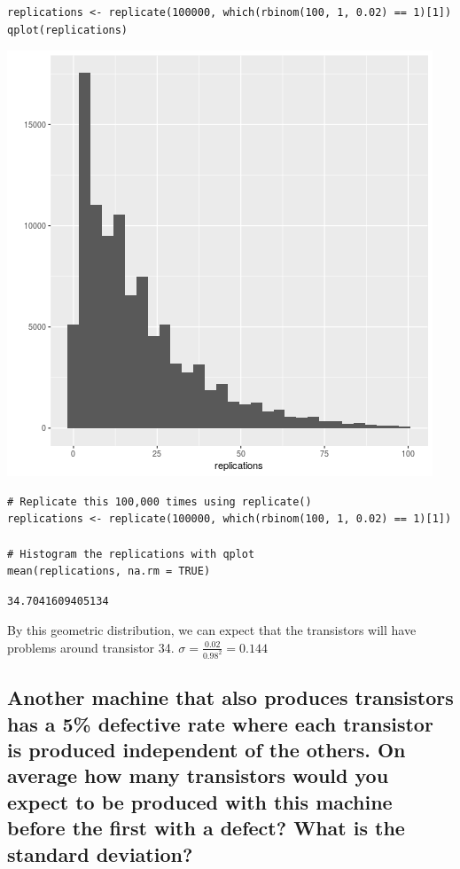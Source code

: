 \documentclass[11pt]{article}
\begin{document}
\begin{verbatim}
replications <- replicate(100000, which(rbinom(100, 1, 0.02) == 1)[1])
qplot(replications)
\end{verbatim}

\begin{center}
\includegraphics[width=.9\linewidth]{geom.png}
\end{center}

\begin{verbatim}
# Replicate this 100,000 times using replicate()
replications <- replicate(100000, which(rbinom(100, 1, 0.02) == 1)[1])

# Histogram the replications with qplot
mean(replications, na.rm = TRUE)
\end{verbatim}

\begin{verbatim}
34.7041609405134
\end{verbatim}


By this geometric distribution, we can expect that the transistors will have problems around transistor 34. \(\sigma = \frac{0.02}{0.98^2} = 0.144\)
\subsection{Another machine that also produces transistors has a 5\% defective rate where each transistor is produced independent of the others. On average how many transistors would you expect to be produced with this machine before the first with a defect? What is the standard deviation?}
\label{sec:org292b403}
\end{document}
